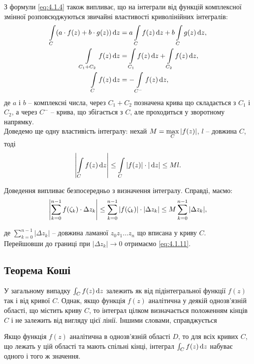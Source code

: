 З формули \eqref{eq:4.1.4} також випливає, що на інтеграли від функцій комплексної змінної розповсюджуються звичайні властивості криволінійних інтегралів:
\begin{align}
	\label{eq:4.1.8}
	\Int_C (a \cdot f(z) + b\cdot g(z)) \diff z &= a \Int_C f(z) \diff z + b \Int_C g(z) \diff z, \\
	\label{eq:4.1.9}
	\Int_{C_1 + C_2} f(z) \diff z &= \Int_{C_1} f(z) \diff z + \Int_{C_2} f(z) \diff z, \\
	\label{eq:4.1.10}
	\Int_C f(z) \diff z &= - \Int_{C^-} f(z) \diff z,
\end{align}
де $a$ і $b$ -- комплексні числа, через $C_1 + C_2$ позначена крива що складається з $C_1$ і $C_2$, а через $C^-$ -- крива, що збігається з $C$, але проходиться у зворотному напрямку. \\

Доведемо ще одну властивість інтегралу: нехай $M = \displaystyle\max\limits_C |f(z)|$, $l$ -- довжина $C$, тоді
\begin{equation}
	\label{eq:4.1.11}
	\left| \displaystyle\int\limits_C f(z) \mathop{}\!\mathrm{d} z \right| \le \displaystyle\int\limits_C |f(z)| \cdot |\mathop{}\!\mathrm{d} z| \le M l.
\end{equation}

Доведення випливає безпосередньо з визначення інтегралу. Справді, маємо:
\begin{equation}
	\label{eq:4.1.12}
	\left| \displaystyle\sum\limits_{k = 0}^{n - 1} f(\zeta_k) \cdot\Delta z_k \right| \le \displaystyle\sum\limits_{k = 0}^{n - 1} |f(\zeta_k) |\cdot |\Delta z_k| \le M \displaystyle\sum\limits_{k = 0}^{n - 1} |\Delta z_k|,
\end{equation}

де $\sum_{k = 0}^{n - 1} |\Delta z_k|$ -- довжина ламаної $z_0 z_1 \ldots z_n$ що вписана у криву $C$. \\

Перейшовши до границі при $|\Delta z_k| \to 0$ отримаємо \eqref{eq:4.1.11}.

\subsection{Теорема Коші}
У загальному випадку $\int_C f(z) \mathop{}\!\mathrm{d} z$ залежить як від підінтегральної функції $f(z)$ так і від кривої $C$. Однак, якщо функція $f(z)$ аналітична у деякій однозв'язній області, що містить криву $C$, то інтеграл цілком визначається положенням кінців $C$ і не залежить від вигляду цієї лінії. Іншими словами, справджується

\begin{theorem}[О. Коші, 1825 р.]
\label{th:4.2.1}
Якщо функція $f(z)$ аналітична в однозв'язній області $D$, то для всіх кривих $C$, що лежать у цій області та мають спільні кінці, інтеграл $\int_C f(z) \mathop{}\!\mathrm{d} z$ набуває одного і того ж значення.
\end{theorem}

